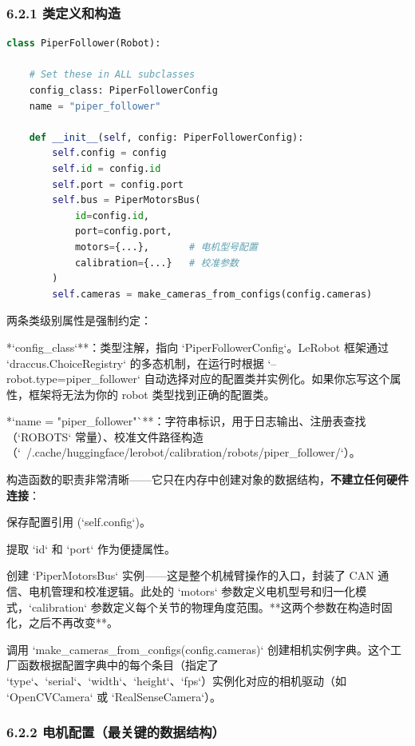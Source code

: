 \documentclass[UTF8,a4paper,11pt]{ctexart}
\begin{document}
{\subsubsection{6.2.1 类定义和构造}

\begin{lstlisting}[language=python]
class PiperFollower(Robot):

    # Set these in ALL subclasses
    config_class: PiperFollowerConfig
    name = "piper_follower"

    def __init__(self, config: PiperFollowerConfig):
        self.config = config
        self.id = config.id
        self.port = config.port
        self.bus = PiperMotorsBus(
            id=config.id,
            port=config.port,
            motors={...},       # 电机型号配置
            calibration={...}   # 校准参数
        )
        self.cameras = make_cameras_from_configs(config.cameras)
\end{lstlisting}

两条类级别属性是强制约定：

\item **`config_class`**：类型注解，指向 `PiperFollowerConfig`。LeRobot 框架通过 `draccus.ChoiceRegistry` 的多态机制，在运行时根据 `--robot.type=piper_follower` 自动选择对应的配置类并实例化。如果你忘写这个属性，框架将无法为你的 robot 类型找到正确的配置类。
\item **`name = "piper_follower"`**：字符串标识，用于日志输出、注册表查找（`ROBOTS` 常量）、校准文件路径构造（`~/.cache/huggingface/lerobot/calibration/robots/piper_follower/`）。

构造函数的职责非常清晰——它只在内存中创建对象的数据结构，\textbf{不建立任何硬件连接}：

\item[1] 保存配置引用 (`self.config`)。
\item[2] 提取 `id` 和 `port` 作为便捷属性。
\item[3] 创建 `PiperMotorsBus` 实例——这是整个机械臂操作的入口，封装了 CAN 通信、电机管理和校准逻辑。此处的 `motors` 参数定义电机型号和归一化模式，`calibration` 参数定义每个关节的物理角度范围。**这两个参数在构造时固化，之后不再改变**。
\item[4] 调用 `make_cameras_from_configs(config.cameras)` 创建相机实例字典。这个工厂函数根据配置字典中的每个条目（指定了 `type`、`serial`、`width`、`height`、`fps`）实例化对应的相机驱动（如 `OpenCVCamera` 或 `RealSenseCamera`）。

\subsubsection{6.2.2 电机配置（最关键的数据结构）}

}
\end{document}
